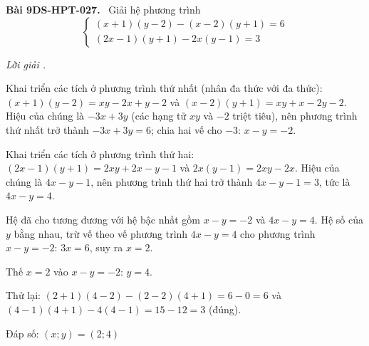 \documentclass[12pt,a4paper]{article}
\newenvironment{problem}[1][]{\par\medskip\noindent\textbf{Bài #1.}\ }{\par}
\newenvironment{solution}[1][]{\par\noindent\textit{Lời giải #1.}\par}{\par}
\begin{document}
\begin{problem}[9DS-HPT-027]
Giải hệ phương trình
\[ \begin{cases} (x + 1)(y - 2) - (x - 2)(y + 1) = 6 \\ (2x - 1)(y + 1) - 2x(y - 1) = 3 \end{cases} \]

\begin{solution}
Khai triển các tích ở phương trình thứ nhất (nhân đa thức với đa thức): $(x + 1)(y - 2) = xy - 2x + y - 2$ và $(x - 2)(y + 1) = xy + x - 2y - 2$. Hiệu của chúng là $-3x + 3y$ (các hạng tử $xy$ và $-2$ triệt tiêu), nên phương trình thứ nhất trở thành $-3x + 3y = 6$; chia hai vế cho $-3$: $x - y = -2$.

Khai triển các tích ở phương trình thứ hai: $(2x - 1)(y + 1) = 2xy + 2x - y - 1$ và $2x(y - 1) = 2xy - 2x$. Hiệu của chúng là $4x - y - 1$, nên phương trình thứ hai trở thành $4x - y - 1 = 3$, tức là $4x - y = 4$.

Hệ đã cho tương đương với hệ bậc nhất gồm $x - y = -2$ và $4x - y = 4$. Hệ số của $y$ bằng nhau, trừ vế theo vế phương trình $4x - y = 4$ cho phương trình $x - y = -2$: $3x = 6$, suy ra $x = 2$.

Thế $x = 2$ vào $x - y = -2$: $y = 4$.

Thử lại: $(2 + 1)(4 - 2) - (2 - 2)(4 + 1) = 6 - 0 = 6$ và $(4 - 1)(4 + 1) - 4(4 - 1) = 15 - 12 = 3$ (đúng).

Đáp số: $\boxed{(x; y) = (2; 4)}$
\end{solution}
\end{problem}
\end{document}
